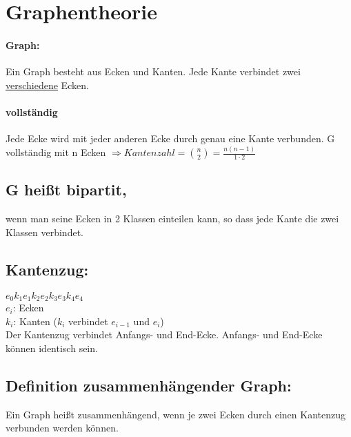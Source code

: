 \section{Graphentheorie}
\paragraph{Graph:} Ein Graph besteht aus Ecken und Kanten. Jede Kante verbindet zwei \underline{verschiedene} Ecken.
\paragraph{vollständig} Jede Ecke wird mit jeder anderen Ecke durch genau eine Kante verbunden. G vollständig mit n Ecken $\Rightarrow Kantenzahl = \binom{n}{2}=\frac{n(n-1)}{1\cdot 2}$



 
\subsection{G heißt bipartit,} wenn man seine Ecken in 2 Klassen einteilen kann, so dass jede Kante die zwei Klassen verbindet. 




\subsection{Kantenzug:} $e_0 k_1 e_1 k_2 e_2 k_3 e_3 k_4 e_4$\\
$e_i$: Ecken\\
$k_i$: Kanten ($k_i$ verbindet $e_{i-1}$ und $e_i$)\\
Der Kantenzug verbindet Anfangs- und End-Ecke. Anfangs- und End-Ecke können identisch sein. 



\subsection{Definition zusammenhängender Graph:}Ein Graph heißt zusammenhängend, wenn je zwei Ecken durch einen Kantenzug verbunden werden können. 




